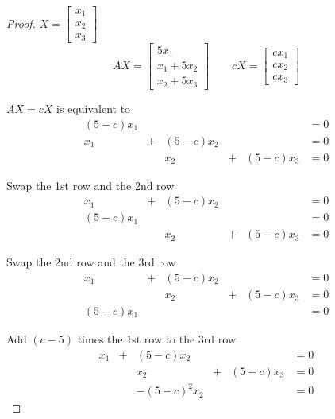 \begin{proof}
    $X = \begin{bmatrix} x_{1} \\ x_{2} \\ x_{3} \end{bmatrix}$
    \[
        AX = \begin{bmatrix}
            5x_{1}         \\
            x_{1} + 5x_{2} \\
            x_{2} + 5x_{3}
        \end{bmatrix}
        \qquad
        cX = \begin{bmatrix}
            cx_{1} \\
            cx_{2} \\
            cx_{3}
        \end{bmatrix}
    \]

    $AX = cX$ is equivalent to
    \[
        \begin{array}{cccccc}
            (5-c)x_{1} &   &            &   &            & = 0 \\
            x_{1}      & + & (5-c)x_{2} &   &            & = 0 \\
                       &   & x_{2}      & + & (5-c)x_{3} & = 0
        \end{array}
    \]

    Swap the 1st row and the 2nd row
    \[
        \begin{array}{cccccc}
            x_{1}      & + & (5-c)x_{2} &   &            & = 0 \\
            (5-c)x_{1} &   &            &   &            & = 0 \\
                       &   & x_{2}      & + & (5-c)x_{3} & = 0
        \end{array}
    \]

    Swap the 2nd row and the 3rd row
    \[
        \begin{array}{cccccc}
            x_{1}      & + & (5-c)x_{2} &   &            & = 0 \\
                       &   & x_{2}      & + & (5-c)x_{3} & = 0 \\
            (5-c)x_{1} &   &            &   &            & = 0
        \end{array}
    \]

    Add $(c-5)$ times the 1st row to the 3rd row
    \[
        \begin{array}{cccccc}
            x_{1} & + & (5-c)x_{2}        &   &            & = 0 \\
                  &   & x_{2}             & + & (5-c)x_{3} & = 0 \\
                  &   & -{(5-c)}^{2}x_{2} &   &            & = 0
        \end{array}
    \]


\end{proof}
